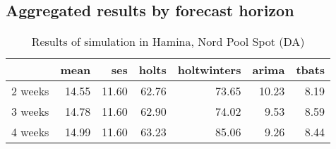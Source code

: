 



\subsection{Aggregated results by forecast horizon}

\begin{table}[ht]
\centering
\begin{tabular}{rrrrrrr}
  \hline
 & mean & ses & holts & holtwinters & arima & tbats \\ 
  \hline
2 weeks & 14.55 & 11.60 & 62.76 & 73.65 & 10.23 & 8.19 \\ 
  3 weeks & 14.78 & 11.60 & 62.90 & 74.02 & 9.53 & 8.59 \\ 
  4 weeks & 14.99 & 11.60 & 63.23 & 85.06 & 9.26 & 8.44 \\ 
   \hline
\end{tabular}
\caption{Results of simulation in Hamina, Nord Pool Spot (DA)} 
\end{table}


